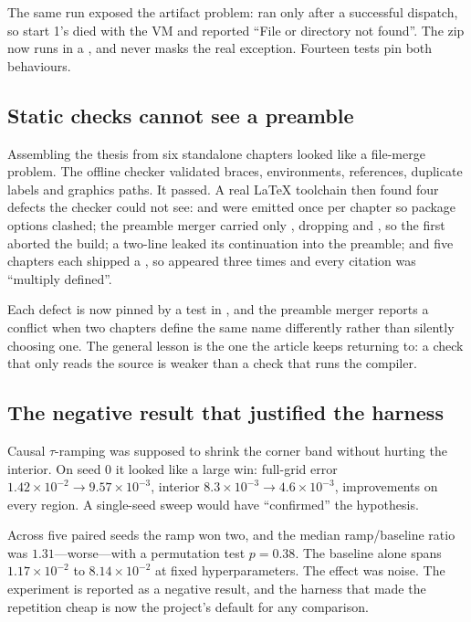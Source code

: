 The same run exposed the artifact problem:  ran only after a
successful dispatch, so start 1's  died with the VM and
 reported ``File or directory not found''. The zip now runs
in a , and  never masks the real
exception. Fourteen tests pin both behaviours.

\subsection{Static checks cannot see a preamble}
\label{sec:failbuild}

Assembling the thesis from six standalone chapters looked like a file-merge
problem. The offline checker validated braces, environments, references,
duplicate labels and graphics paths. It passed. A real LaTeX toolchain then
found four defects the checker could not see:  and 
were emitted once per chapter so package options clashed; the preamble merger
carried only , dropping
 and , so the first  aborted the build; a two-line
 leaked its continuation into the preamble; and five
chapters each shipped a , so 
appeared three times and every citation was ``multiply defined''.

Each defect is now pinned by a test in , and the
preamble merger reports a conflict when two chapters define the same name
differently rather than silently choosing one. The general lesson is the one the
article keeps returning to: a check that only reads the source is weaker than a
check that runs the compiler.

\subsection{The negative result that justified the harness}
\label{sec:failtau}

Causal $\tau$-ramping was supposed to shrink the corner band without hurting the
interior. On seed 0 it looked like a large win: full-grid error
$1.42\times10^{-2}\to9.57\times10^{-3}$, interior $8.3\times10^{-3}\to
4.6\times10^{-3}$, improvements on every region. A single-seed sweep would have
``confirmed'' the hypothesis.

Across five paired seeds the ramp won two, and the median ramp/baseline ratio
was $1.31$---worse---with a permutation test $p=0.38$. The baseline alone spans
$1.17\times10^{-2}$ to $8.14\times10^{-2}$ at fixed hyperparameters. The effect
was noise. The experiment is reported as a negative result, and the harness that
made the repetition cheap is now the project's default for any comparison.


